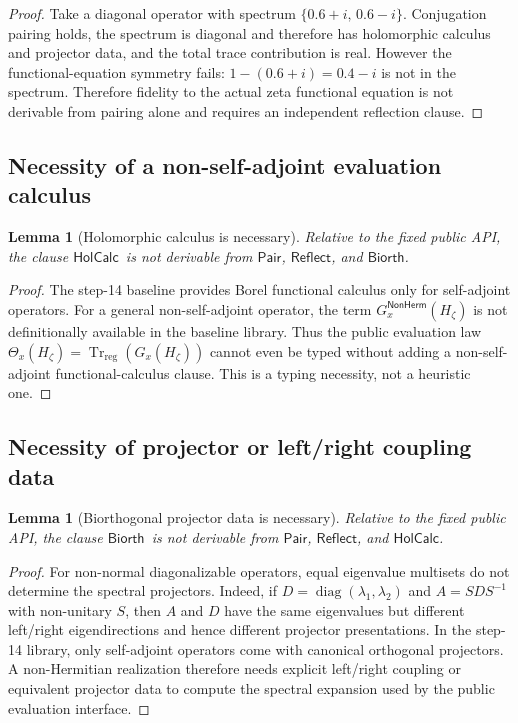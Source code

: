 \documentclass[11pt,a4paper]{article}
\theoremstyle{plain}
\newtheorem{lemma}[theorem]{Lemma}
\theoremstyle{definition}
\theoremstyle{remark}
\newcommand{\Trreg}{\operatorname{Tr}_{\mathrm{reg}}}
\newcommand{\pair}{\ensuremath{\mathsf{Pair}}}
\newcommand{\reflect}{\ensuremath{\mathsf{Reflect}}}
\newcommand{\holcalc}{\ensuremath{\mathsf{HolCalc}}}
\newcommand{\biorth}{\ensuremath{\mathsf{Biorth}}}
\newcommand{\nonherm}{\ensuremath{\mathsf{NonHerm}}}
\begin{document}
\begin{proof}
Take a diagonal operator with spectrum $\{0.6+i,\,0.6-i\}$. Conjugation pairing holds, the spectrum is diagonal and therefore has holomorphic calculus and projector data, and the total trace contribution is real. However the functional-equation symmetry fails: $1-(0.6+i)=0.4-i$ is not in the spectrum. Therefore fidelity to the actual zeta functional equation is not derivable from pairing alone and requires an independent reflection clause.
\end{proof}

\subsection{Necessity of a non-self-adjoint evaluation calculus}

\begin{lemma}[Holomorphic calculus is necessary]
\label{lem:holcalc-necessary}
Relative to the fixed public API, the clause \holcalc\ is not derivable from \pair, \reflect, and \biorth.
\end{lemma}

\begin{proof}
The step-14 baseline provides Borel functional calculus only for self-adjoint operators. For a general non-self-adjoint operator, the term $G_x^{\nonherm}(H_\zeta)$ is not definitionally available in the baseline library. Thus the public evaluation law $\Theta_x(H_\zeta)=\Trreg(G_x(H_\zeta))$ cannot even be typed without adding a non-self-adjoint functional-calculus clause. This is a typing necessity, not a heuristic one.
\end{proof}

\subsection{Necessity of projector or left/right coupling data}

\begin{lemma}[Biorthogonal projector data is necessary]
\label{lem:biorth-necessary}
Relative to the fixed public API, the clause \biorth\ is not derivable from \pair, \reflect, and \holcalc.
\end{lemma}

\begin{proof}
For non-normal diagonalizable operators, equal eigenvalue multisets do not determine the spectral projectors. Indeed, if $D=\operatorname{diag}(\lambda_1,\lambda_2)$ and $A=SDS^{-1}$ with non-unitary $S$, then $A$ and $D$ have the same eigenvalues but different left/right eigendirections and hence different projector presentations. In the step-14 library, only self-adjoint operators come with canonical orthogonal projectors. A non-Hermitian realization therefore needs explicit left/right coupling or equivalent projector data to compute the spectral expansion used by the public evaluation interface.
\end{proof}
\end{document}
